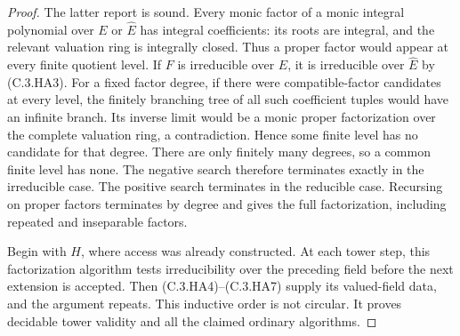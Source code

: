 \begin{proof}
The latter report is sound.
Every monic factor of a monic
integral polynomial over $E$
or $\widehat E$ has integral
coefficients: its roots are
integral, and the relevant
valuation ring is integrally
closed.  Thus a proper factor
would appear at every finite
quotient level.
If $F$ is irreducible over $E$,
it is irreducible over $\widehat E$
by (C.3.HA3).
For a fixed factor degree, if
there were compatible-factor
candidates at every level,
the finitely branching tree of
all such coefficient tuples
would have an infinite branch.
Its inverse limit would be a
monic proper factorization over
the complete valuation ring,
a contradiction.  Hence some
finite level has no candidate
for that degree.  There are
only finitely many degrees,
so a common finite level
has none.  The negative search
therefore terminates exactly
in the irreducible case.
The positive search terminates
in the reducible case.
Recursing on proper factors
terminates by degree and
gives the full factorization,
including repeated and
inseparable factors.

Begin with $H$, where access
was already constructed.
At each tower step, this
factorization algorithm tests
irreducibility over the
preceding field before the
next extension is accepted.
Then (C.3.HA4)--(C.3.HA7)
supply its valued-field data,
and the argument repeats.
This inductive order is not
circular.  It proves decidable
tower validity and all the
claimed ordinary algorithms.
\end{proof}

